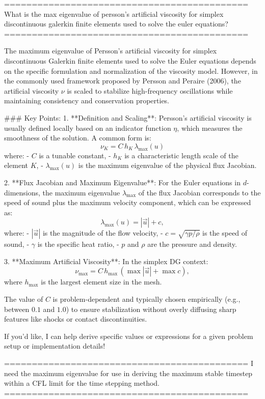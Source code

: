 ============================================
What is the max eigenvalue of persson’s artificial viscosity for simplex discontinuous galerkin finite elements used to solve the euler equations?
============================================

The maximum eigenvalue of Persson's artificial viscosity for simplex discontinuous Galerkin finite elements used to solve the Euler equations depends on the specific formulation and normalization of the viscosity model. However, in the commonly used framework proposed by Persson and Peraire (2006), the artificial viscosity \(\nu\) is scaled to stabilize high-frequency oscillations while maintaining consistency and conservation properties.

### Key Points:
1. **Definition and Scaling**:
   Persson's artificial viscosity is usually defined locally based on an indicator function \( \eta \), which measures the smoothness of the solution. A common form is:
   \[
   \nu_K = C \, h_K \, \lambda_{\text{max}}(u)
   \]
   where:
   - \(C\) is a tunable constant,
   - \(h_K\) is a characteristic length scale of the element \(K\),
   - \(\lambda_{\text{max}}(u)\) is the maximum eigenvalue of the physical flux Jacobian.

2. **Flux Jacobian and Maximum Eigenvalue**:
   For the Euler equations in \(d\)-dimensions, the maximum eigenvalue \(\lambda_{\text{max}}\) of the flux Jacobian corresponds to the speed of sound plus the maximum velocity component, which can be expressed as:
   \[
   \lambda_{\text{max}}(u) = |\vec{u}| + c,
   \]
   where:
   - \(|\vec{u}|\) is the magnitude of the flow velocity,
   - \(c = \sqrt{\gamma p / \rho}\) is the speed of sound,
   - \(\gamma\) is the specific heat ratio,
   - \(p\) and \(\rho\) are the pressure and density.

3. **Maximum Artificial Viscosity**:
   In the simplex DG context:
   \[
   \nu_{\text{max}} = C \, h_{\text{max}} \, (\max |\vec{u}| + \max c),
   \]
   where \(h_{\text{max}}\) is the largest element size in the mesh.

The value of \(C\) is problem-dependent and typically chosen empirically (e.g., between \(0.1\) and \(1.0\)) to ensure stabilization without overly diffusing sharp features like shocks or contact discontinuities.

If you'd like, I can help derive specific values or expressions for a given problem setup or implementation details!

============================================
I need the maximum eigenvalue for use in deriving the maximum stable timestep within a CFL limit for the time stepping method.
============================================

